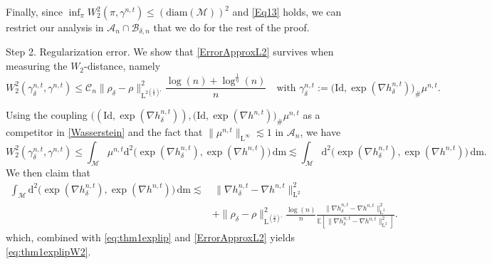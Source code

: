 \documentclass[11pt,a4paper,oneside]{amsart}
\numberwithin{equation}{section}
\newcommand{\dd}{\mathrm{d}}
\newcommand{\LL}{\mathrm{L}}
\newcommand{\m}{\mathrm{m}}
\begin{document}
%
\medskip
%

Finally, since $\inf_\pi W^2_2(\pi,\gamma^{n,t})\leq (\text{diam}(\mathcal{M}))^2$ and \eqref{Eq13} holds, we can restrict our analysis in $\mathcal{A}_n\cap\mathcal{B}_{\delta,n}$ that we do for the rest of the proof.

%
\medskip
%
{\sc Step 2. Regularization error.}
%
We show that \eqref{ErrorApproxL2} survives when measuring the $W_2$-distance, namely
%
\begin{equation}\label{eq:thm1explipW2}
%
W^2_2(\gamma^{n,t}_\delta,\gamma^{n,t})\leq \mathcal{C}_n \|\rho_\delta-\rho\|^2_{\LL^{2(\frac{\bar{q}}{2})'}}\frac{\log(n)+\log^{\frac{1}{\eta}}(n)}{n}\quad\text{with }\gamma^{n,t}_{\delta}:=\big(\mathrm{Id},\exp(\nabla h^{n,t}_\delta)\big)_\#\mu^{n,t}.
%
\end{equation}
%


%
\medskip
%

Using the coupling $\big((\mathrm{Id},\exp(\nabla h^{n,t}_\delta)),(\mathrm{Id},\exp(\nabla h^{n,t})\big)_\#\mu^{n,t}$ as a competitor in \eqref{Wasserstein} and the fact that $\|\mu^{n,t}\|_{\LL^{\infty}}\lesssim 1$ in $\mathcal{A}_n$, we have
%
\begin{equation}\label{eq:thm1explip}
W^2_2(\gamma^{n,t}_\delta,\gamma^{n,t})\leq \int_{\mathcal{M}}\mu^{n,t}\dd^2 \big(\exp(\nabla h^{n,t}_\delta), \exp(\nabla h^{n,t})\big)\,\dd\m\lesssim \int_{\mathcal{M}}\dd^2 \big(\exp(\nabla h^{n,t}_\delta), \exp(\nabla h^{n,t})\big)\,\dd\m.
\end{equation}
%
We then claim that 
%
\begin{equation}\label{eq:thm1explip2}
\begin{aligned}
\int_\mathcal{M} \dd^2 \big(\exp(\nabla h^{n,t}_\delta), \exp(\nabla h^{n,t})\big)\,\dd\m \lesssim&\,\| \nabla h^{n,t}_\delta - \nabla h^{n,t} \|_{\LL^2}^2\\
&+ \|\rho_\delta-\rho\|^2_{\LL^{(\frac{\bar{q}}{2})'}}\frac{\log(n)}{n}\frac{\| \nabla h^{n,t}_\delta - \nabla h^{n,t}\|_{\LL^2}^2}{\mathbb{E}[ \| \nabla h^{n,t}_\delta - \nabla h^{n,t}\|^{2}_{\LL^2}]}.
\end{aligned}
\end{equation}
%
which, combined with \eqref{eq:thm1explip} and \eqref{ErrorApproxL2} yields \eqref{eq:thm1explipW2}.

%
\medskip
%
\end{document}
